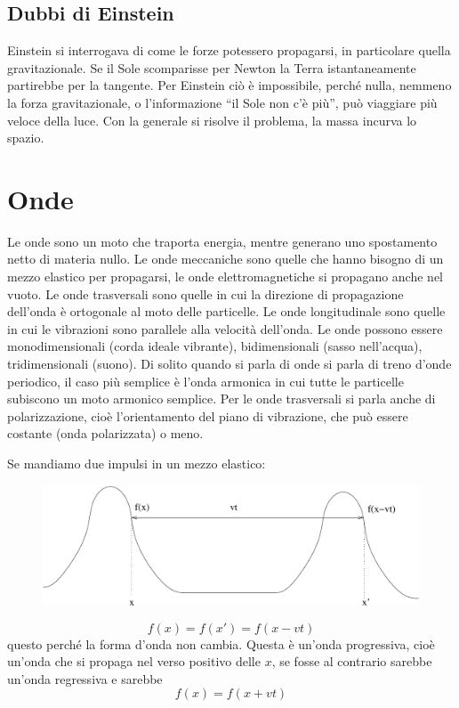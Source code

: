 \section{Dubbi di Einstein}
Einstein si interrogava di come le forze potessero propagarsi, in particolare quella gravitazionale. Se il Sole scomparisse per Newton la Terra istantaneamente partirebbe per la tangente. Per Einstein ciò è impossibile, perché nulla, nemmeno la forza gravitazionale, o l'informazione ``il Sole non c'è più'', può viaggiare più veloce della luce. Con la generale si risolve il problema, la massa incurva lo spazio.

\chapter{Onde}
Le onde sono un moto che traporta energia, mentre generano uno spostamento netto di materia nullo. Le onde meccaniche sono quelle che hanno bisogno di un mezzo elastico per propagarsi, le onde elettromagnetiche si propagano anche nel vuoto. Le onde trasversali sono quelle in cui la direzione di propagazione dell'onda è ortogonale al moto delle particelle. Le onde longitudinale sono quelle in cui le vibrazioni sono parallele alla velocità dell'onda. Le onde possono essere monodimensionali (corda ideale vibrante), bidimensionali (sasso nell'acqua), tridimensionali (suono). Di solito quando si parla di onde si parla di treno d'onde periodico, il caso più semplice è l'onda armonica in cui tutte le particelle subiscono un moto armonico semplice. Per le onde trasversali si parla anche di polarizzazione, cioè l'orientamento del piano di vibrazione, che può essere costante (onda polarizzata) o meno.

Se mandiamo due impulsi in un mezzo elastico:
\begin{figure}[htbp]
   \centering
   \includegraphics[scale=0.5]{immagini/fisica1/Onda1}
\end{figure}
$$f(x)=f(x')=f(x-vt)$$
questo perché la forma d'onda non cambia. Questa è un'onda progressiva, cioè un'onda che si propaga nel verso positivo delle $x$, se fosse al contrario sarebbe un'onda regressiva e sarebbe
$$f(x)=f(x+vt)$$
